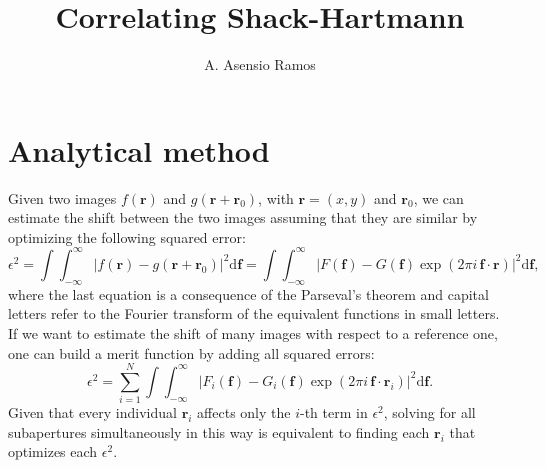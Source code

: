 \documentclass[iop,onecolumn]{emulateapj}
\begin{document}
\title{Correlating Shack-Hartmann}
\author{A. Asensio Ramos}

\maketitle

\section{Analytical method}
Given two images $f(\mathbf{r})$ and $g(\mathbf{r}+\mathbf{r}_0)$, with $\mathbf{r}=(x,y)$
and $\mathbf{r}_0$, we can estimate the shift between the two images assuming that they
are similar by optimizing the following squared error:
\begin{equation}
\epsilon^2 = \int \int_{-\infty}^{\infty} \left| f(\mathbf{r}) - g(\mathbf{r}+\mathbf{r}_0)\right|^2 \mathrm{d}\mathbf{f}= 
\int \int_{-\infty}^{\infty} \left| F(\mathbf{f}) - G(\mathbf{f}) \exp \left( 2\pi i \,\mathbf{f} \cdot \mathbf{r}
\right) \right|^2 \mathrm{d}\mathbf{f},
\end{equation}
where the last equation is a consequence of the Parseval's theorem and capital
letters refer to the Fourier transform of the equivalent functions in small letters. If we want to estimate
the shift of many images with respect to a reference one, one can build a merit function
by adding all squared errors:
\begin{equation}
\epsilon^2 = \sum_{i=1}^N  
\int \int_{-\infty}^{\infty} \left| F_i(\mathbf{f}) - G_i(\mathbf{f}) \exp \left( 2\pi i \,\mathbf{f} \cdot \mathbf{r}_i
\right) \right|^2 \mathrm{d}\mathbf{f}.
\label{eq:merit}
\end{equation}
Given that every individual $\mathbf{r}_i$ affects only the $i$-th term in $\epsilon^2$, solving
for all subapertures simultaneously in this way is equivalent to finding each $\mathbf{r}_i$
that optimizes each $\epsilon^2$.
\end{document}
